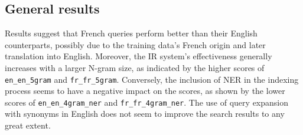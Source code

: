 
\subsection{General results}\label{subsec:general-results}

Results suggest that French queries perform better than their English counterparts, possibly due to the training data's
French origin and later translation into English.
Moreover, the IR system's effectiveness generally increases with a larger N-gram size, as indicated by the higher scores
of \texttt{en\_en\_5gram} and \texttt{fr\_fr\_5gram}.
Conversely, the inclusion of NER in the indexing process seems to have a negative impact on the scores, as shown by the
lower scores of \texttt{en\_en\_4gram\_ner} and \texttt{fr\_fr\_4gram\_ner}.
The use of query expansion with synonyms in English does not seem to improve the search results to any great extent.\\

